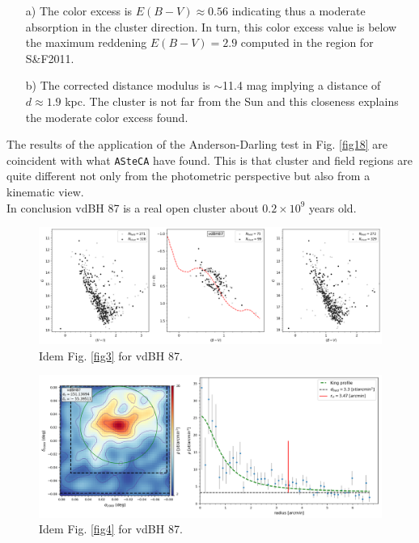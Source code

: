\documentclass[draft]{aa}
\begin{document}
\begin{itemize}
\item [a)] The color excess is $E(B-V)\approx0.56$ indicating thus a moderate
    absorption in the cluster direction. In turn, this color excess value is
    below the maximum reddening $E(B-V)=2.9$ computed in the region for 
    S\&F2011.
\item [b)] The corrected distance modulus is $\sim$11.4 mag implying a distance
    of $d\approx1.9$ kpc. The cluster is not far from the Sun and this
    closeness explains the moderate color excess found.
\end{itemize}

The results of the application of the Anderson-Darling test in Fig. \ref{fig18}
are coincident with what \texttt{ASteCA} have found. This is that cluster and
field regions are quite different not only from the photometric perspective but
also from a kinematic view.\\

In conclusion vdBH 87 is a real open cluster about $0.2\times10^9$ years old.

\begin{figure}[ht]
    \centering
    \includegraphics[width=\hsize]{../figs/obs_vdBH87.png}
    \caption{Idem Fig. \ref{fig3} for vdBH 87.}
    \label{fig15}
\end{figure}

\begin{figure}[ht]
    \centering
    \includegraphics[width=\hsize]{../figs/dmap_vdbh87.png}
    \caption{Idem Fig. \ref{fig4} for vdBH 87.}
    \label{fig16}
\end{figure}
\end{document}
